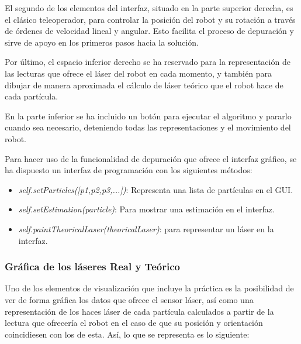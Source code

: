 El segundo de los elementos del interfaz, situado en la parte superior derecha, es el clásico teleoperador, para controlar la posición del robot y su rotación a través de órdenes de velocidad lineal y angular. Esto facilita el proceso de depuración y sirve de apoyo en los primeros pasos hacia la solución.

Por último, el espacio inferior derecho se ha reservado para la representación de las lecturas que ofrece el láser del robot en cada momento, y también para dibujar de manera aproximada el cálculo de láser teórico que el robot hace de cada partícula.

En la parte inferior se ha incluido un botón para ejecutar el algoritmo y pararlo cuando sea necesario, deteniendo todas las representaciones y el movimiento del robot. 

Para hacer uso de la funcionalidad de depuración que ofrece el interfaz gráfico, se ha dispuesto un interfaz de programación con los siguientes métodos:

\begin{itemize}
	\item \textit{self.setParticles([p1,p2,p3,...])}: Representa una lista de partículas en el GUI.
	\item \textit{self.setEstimation(particle)}: Para mostrar una estimación en el interfaz.
	\item \textit{self.paintTheoricalLaser(theoricalLaser)}: para representar un láser en la interfaz.
\end{itemize}

\subsubsection{Gráfica de los láseres Real y Teórico}
Uno de los elementos de visualización que incluye la práctica es la posibilidad de ver de forma gráfica los datos que ofrece el sensor láser, así como una representación de los haces láser de cada partícula calculados a partir de la lectura que ofrecería el robot en el caso de que su posición y orientación coincidiesen con los de esta. Así, lo que se representa es lo siguiente:

